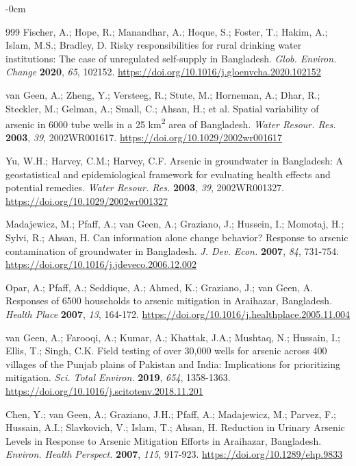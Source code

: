 \documentclass[sustainability,article,submit,pdftex,moreauthors]{Definitions/mdpi}
\begin{document}
\begin{adjustwidth}{-\extralength}{0cm}
\begin{thebibliography}{999}
Fischer, A.; Hope, R.; Manandhar, A.; Hoque, S.; Foster, T.; Hakim, A.; Islam, M.S.; Bradley, D. Risky responsibilities for rural drinking water institutions: The case of unregulated self-supply in Bangladesh. \textit{Glob. Environ. Change} \textbf{2020}, \textit{65}, 102152. \url{https://doi.org/10.1016/j.gloenvcha.2020.102152}

van Geen, A.; Zheng, Y.; Versteeg, R.; Stute, M.; Horneman, A.; Dhar, R.; Steckler, M.; Gelman, A.; Small, C.; Ahsan, H.; et al. Spatial variability of arsenic in 6000 tube wells in a 25 km\textsuperscript{2} area of Bangladesh. \textit{Water Resour. Res.} \textbf{2003}, \textit{39}, 2002WR001617. \url{https://doi.org/10.1029/2002wr001617}

Yu, W.H.; Harvey, C.M.; Harvey, C.F. Arsenic in groundwater in Bangladesh: A geostatistical and epidemiological framework for evaluating health effects and potential remedies. \textit{Water Resour. Res.} \textbf{2003}, \textit{39}, 2002WR001327. \url{https://doi.org/10.1029/2002wr001327}

Madajewicz, M.; Pfaff, A.; van Geen, A.; Graziano, J.; Hussein, I.; Momotaj, H.; Sylvi, R.; Ahsan, H. Can information alone change behavior? Response to arsenic contamination of groundwater in Bangladesh. \textit{J. Dev. Econ.} \textbf{2007}, \textit{84}, 731-754. \url{https://doi.org/10.1016/j.jdeveco.2006.12.002}

Opar, A.; Pfaff, A.; Seddique, A.; Ahmed, K.; Graziano, J.; van Geen, A. Responses of 6500 households to arsenic mitigation in Araihazar, Bangladesh. \textit{Health Place} \textbf{2007}, \textit{13}, 164-172. \url{https://doi.org/10.1016/j.healthplace.2005.11.004}

van Geen, A.; Farooqi, A.; Kumar, A.; Khattak, J.A.; Mushtaq, N.; Hussain, I.; Ellis, T.; Singh, C.K. Field testing of over 30,000 wells for arsenic across 400 villages of the Punjab plains of Pakistan and India: Implications for prioritizing mitigation. \textit{Sci. Total Environ.} \textbf{2019}, \textit{654}, 1358-1363. \url{https://doi.org/10.1016/j.scitotenv.2018.11.201}

Chen, Y.; van Geen, A.; Graziano, J.H.; Pfaff, A.; Madajewicz, M.; Parvez, F.; Hussain, A.I.; Slavkovich, V.; Islam, T.; Ahsan, H. Reduction in Urinary Arsenic Levels in Response to Arsenic Mitigation Efforts in Araihazar, Bangladesh. \textit{Environ. Health Perspect.} \textbf{2007}, \textit{115}, 917-923. \url{https://doi.org/10.1289/ehp.9833}


\end{thebibliography}
\end{adjustwidth}
\end{document}
